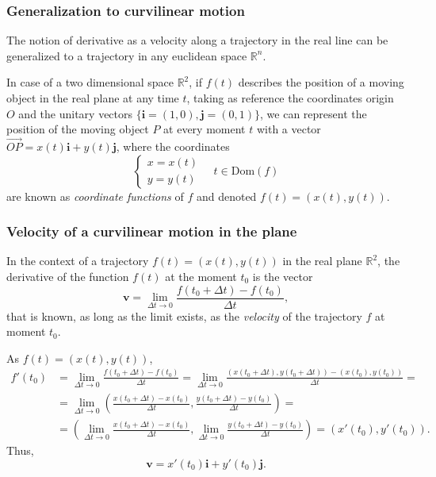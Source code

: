 \begin{frame}
\frametitle{Generalization to curvilinear motion}
The notion of derivative as a velocity along a trajectory in the real line can be generalized to a trajectory in any euclidean space $\mathbb{R}^n$.

In case of a two dimensional space $\mathbb{R}^2$, if $f(t)$ describes the position of a moving object in the real plane at any time $t$, taking as reference the coordinates origin $O$ and the unitary vectors $\{\mathbf{i}=(1,0),\mathbf{j}=(0,1)\}$, we can represent the position of the moving object $P$ at every moment $t$ with a vector $\vec{OP}=x(t)\mathbf{i}+y(t)\mathbf{j}$, where the coordinates 
\[
\begin{cases}
x=x(t)\\
y=y(t)
\end{cases}
\quad
t\in \mbox{Dom}(f)
\]
are known as \emph{coordinate functions} of $f$ and denoted $f(t)=(x(t),y(t))$.

\begin{center}
\end{center}
\end{frame}


\begin{frame}
\frametitle{Velocity of a curvilinear motion in the plane}
In the context of a trajectory $f(t)=(x(t),y(t))$ in the real plane $\mathbb{R}^2$, the derivative of the function $f(t)$ at the moment $t_0$ is the vector
\[
\mathbf{v} = \lim_{\Delta t\rightarrow 0} \frac{f(t_0+\Delta t)-f(t_0)}{\Delta t},
\]
that is known, as long as the limit exists, as the \emph{velocity} of the trajectory $f$ at moment $t_0$.

As $f(t)=(x(t),y(t))$,
\begin{align*}
f'(t_0)&=\lim_{\Delta t\rightarrow 0} \frac{f(t_0+\Delta t)-f(t_0)}{\Delta t} = \lim_{\Delta t\rightarrow 0} \frac{(x(t_0+\Delta t),y(t_0+\Delta t))-(x(t_0),y(t_0))}{\Delta t} =\\
&=  \lim_{\Delta t\rightarrow 0} \left(\frac{x(t_0+\Delta t)-x(t_0)}{\Delta t},\frac{y(t_0+\Delta t)-y(t_0)}{\Delta t}\right) =\\
&= \left(\lim_{\Delta t\rightarrow 0}\frac{x(t_0+\Delta t)-x(t_0)}{\Delta t},\lim_{\Delta t\rightarrow 0}\frac{y(t_0+\Delta t)-y(t_0)}{\Delta t}\right) = (x'(t_0),y'(t_0)).
\end{align*}
Thus, 
\[
\mathbf{v} = x'(t_0)\mathbf{i}+y'(t_0)\mathbf{j}.
\]
\end{frame}


